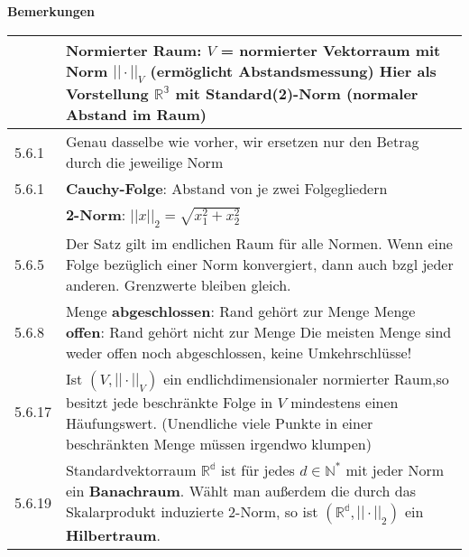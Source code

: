 \noindent
\textbf{Bemerkungen}
\begin{table}[H]
\begin{tabularx}{\textwidth}{X m{16cm}}
    \toprule

          & Normierter Raum: $V$ = normierter Vektorraum mit Norm $||\cdot||_V$ (ermöglicht Abstandsmessung) \hfill \break
            Hier als Vorstellung $\mathbb{R^3}$ mit Standard(2)-Norm (normaler Abstand im Raum) \\
    \midrule
    5.6.1 & Genau dasselbe wie vorher, wir ersetzen nur den Betrag durch die jeweilige Norm \\
    \midrule
    5.6.1 & \textbf{Cauchy-Folge}: Abstand von je zwei Folgegliedern \\
    \midrule
          & \textbf{2-Norm}: $||x||_2 = \sqrt{x_1^2 + x_2^2}$ \\
    \midrule
    5.6.5 & Der Satz gilt im endlichen Raum für alle Normen. \hfill \break
            Wenn eine Folge bezüglich einer Norm konvergiert, dann auch bzgl jeder anderen. \hfill \break 
            Grenzwerte bleiben gleich. \\
    \midrule
    5.6.8 & Menge \textbf{abgeschlossen}: Rand gehört zur Menge \hfill \break
            Menge \textbf{offen}: Rand gehört nicht zur Menge \hfill \break
            Die meisten Menge sind weder offen noch abgeschlossen, keine Umkehrschlüsse! \\
    \midrule
    5.6.17& Ist $(V,||\cdot||_V)$ ein endlichdimensionaler normierter Raum,so besitzt jede beschränkte Folge in 
            $V$ mindestens einen Häufungswert. (Unendliche viele Punkte in einer beschränkten Menge müssen irgendwo klumpen) \\
    \midrule
    5.6.19& Standardvektorraum $\mathbb{R^d}$ ist für jedes $d \in \mathbb{N^*}$ mit jeder Norm ein \textbf{Banachraum}. \hfill \break
            Wählt man au\ss erdem die durch das Skalarprodukt induzierte 2-Norm, so ist $(\mathbb{R^d}, ||\cdot||_2)$ ein \textbf{Hilbertraum}. \\

    \bottomrule
\end{tabularx}
\end{table}

